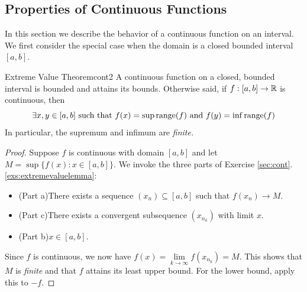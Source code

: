 


\goodbreak



\subsection{Properties of Continuous Functions}\label{sec:propcont}


In this section we describe the behavior of a continuous function on an interval. We first consider the special case when the domain is a closed bounded interval $[a,b]$.




\begin{thm}{Extreme Value Theorem}{cont2}
	A continuous function on a closed, bounded interval is bounded and attains its bounds. Otherwise said, if $f:[a,b]\to\mathbb{R}$ is continuous, then
	\[
		\exists x,y\in [a,b]\text{ such that }f(x)=\sup\operatorname{range}(f)\ \text{and}\  f(y)=\inf\operatorname{range}(f)
	\]
	In particular, the supremum and infimum are \emph{finite.}
\end{thm}


\begin{proof}
	Suppose $f$ is continuous with domain $[a,b]$ and let $M=\sup\{f(x):x\in[a,b]\}$. We invoke the three parts of Exercise \ref*{sec:cont}.\ref{exs:extremevaluelemma}:
	\begin{itemize}\itemsep2pt
	  \item (Part a)\lstsp There exists a sequence $(x_n)\subseteq [a,b]$ such that $f(x_n)\to M$.
	  \item (Part c)\lstsp There exists a convergent subsequence $(x_{n_k})$ with limit $x$.
	  \item (Part b)\lstsp $x\in [a,b]$.
	\end{itemize}
	Since $f$ is continuous, we now have $f(x)=\lim\limits_{k\to\infty}f(x_{n_k})=M$. This shows that $M$ is \emph{finite} and that $f$ attains its least upper bound.
	For the lower bound, apply this to $-f$.
\end{proof}
	
